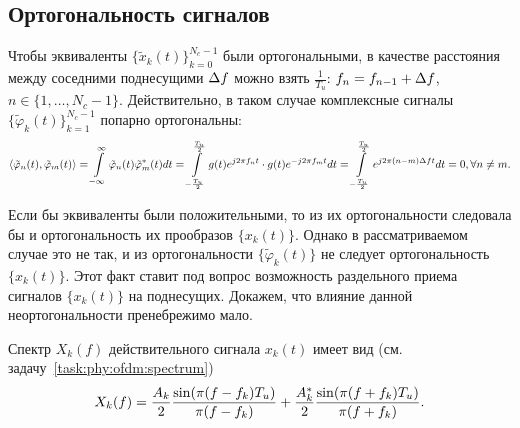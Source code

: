 \documentclass{book}
\numberwithin{theorem}{chapter}
\numberwithin{statement}{chapter}
\numberwithin{lemma}{chapter}
\theoremstyle{definition}
\numberwithin{task}{chapter}
\theoremstyle{remark}
\numberwithin{example}{chapter}
\theoremstyle{definition}
\numberwithin{definition}{chapter}
\theoremstyle{remark}
\theoremstyle{remark}
\numberwithin{lyrics}{section}
\begin{document}
\subsection{Ортогональность сигналов}
Чтобы эквиваленты $\{\tilde{x}_k(t)\}_{k = 0}^{N_c-1}$ были ортогональными, в качестве расстояния между соседними поднесущими $\Delta f$ можно взять $\frac{1}{T_u}$: $f_n = f_{n - 1} + \Delta f$, $n \in \{1, \dots, N_c - 1\}$. Действительно, в таком случае комплексные сигналы $\{\tilde{\varphi}_k(t)\}_{k=1}^{N_c - 1}$ попарно ортогональны:
\begin{equation}
\notag
\langle \tilde{\varphi}_n(t), \tilde{\varphi}_m(t) \rangle =
\int\limits_{-\infty}^{\infty} \tilde{\varphi}_n(t)\tilde{\varphi}_m^*(t) dt = 
\int\limits_{-\frac{T_u}{2}}^{\frac{T_u}{2}} g(t) e^{j2\pi f_n t} \cdot g(t) e^{-j2\pi f_m t} dt = 
\int\limits_{-\frac{T_u}{2}}^{\frac{T_u}{2}} e^{j2\pi(n - m) \Delta f t} dt = 0, \forall n \neq m.
\end{equation}
%

Если бы эквиваленты были положительными, то из их ортогональности следовала бы и ортогональность их прообразов $\{x_k(t)\}$. Однако в рассматриваемом случае это не так, и из ортогональности $\{\tilde{\varphi}_k(t)\}$ не следует ортогональность $\{x_k(t)\}$. Этот факт ставит под вопрос возможность раздельного приема сигналов $\{x_k(t)\}$ на поднесущих. Докажем, что влияние данной неортогональности пренебрежимо мало.

Спектр $X_k(f)$ действительного сигнала $x_k(t)$ имеет вид (см. задачу~\ref{task:phy:ofdm:spectrum})
\begin{gather}
\label{phy:ofdm:fourier_real_signal}
X_k(f) = \frac{A_k}{2} \frac{\sin(\pi (f - f_k)T_u)}{\pi (f - f_k)}  + 
\frac{A_k^*}{2} \frac{\sin(\pi (f + f_k)T_u)}{\pi (f + f_k)}.
\end{gather}
\end{document}
